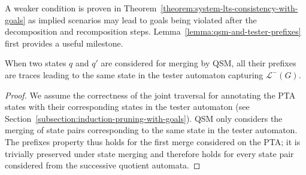 A weaker condition is proven in Theorem~\ref{theorem:system-lts-consistency-with-goals} as implied scenarios may lead to goals being violated after the decomposition and recomposition steps. Lemma~\ref{lemma:qsm-and-tester-prefixes} first provides a useful milestone.

\begin{lemma}
When two states $q$ and $q'$ are considered for merging by QSM, all their prefixes are traces leading to the same state in the tester automaton capturing $\mathcal{L}^-(G)$.\label{lemma:qsm-and-tester-prefixes}
\begin{proof}
We assume the correctness of the joint traversal for annotating the PTA states with their corresponding states in the tester automaton (see Section~\ref{subsection:induction-pruning-with-goals}). QSM only considers the merging of state pairs corresponding to the same state in the tester automaton. The prefixes property thus holds for the first merge considered on the PTA; it is trivially preserved under state merging and therefore holds for every state pair considered from the successive quotient automata.
\end{proof}
\end{lemma}

